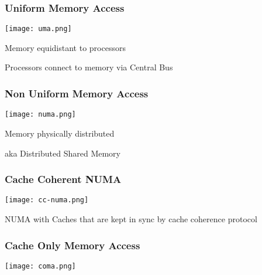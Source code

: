 \documentclass[12pt]{article}
\begin{document}
\begin{spacing}{1.5}
\subsubsection{Uniform Memory Access}

\begin{center}
\texttt{[image: uma.png]}
\end{center}

\begin{itemize*}
	\item Memory equidistant to processors
	\item Processors connect to memory via Central Bus
\end{itemize*}


\subsubsection{Non Uniform Memory Access}

\begin{center}
\texttt{[image: numa.png]}
\end{center}

\begin{itemize*}
	\item Memory physically distributed
	\item aka Distributed Shared Memory
\end{itemize*}

\subsubsection{Cache Coherent NUMA}

\begin{center}
\texttt{[image: cc-numa.png]}
\end{center}

\begin{itemize*}
	\item NUMA with Caches that are kept in sync by cache coherence protocol
\end{itemize*} 

\subsubsection{Cache Only Memory Access}

\begin{center}
\texttt{[image: coma.png]}
\end{center}


\end{spacing}
\end{document}
